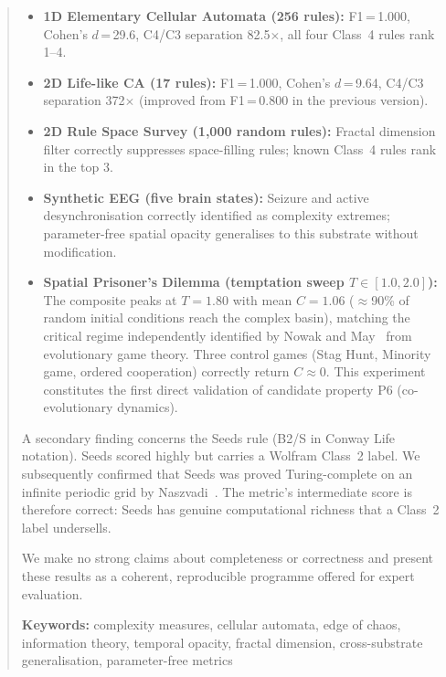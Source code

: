 \documentclass[12pt,a4paper]{article}
\begin{document}
\begin{abstract}
\begin{itemize}[noitemsep]
  \item \textbf{1D Elementary Cellular Automata (256 rules):}
    F1\,=\,1.000, Cohen's $d$\,=\,29.6, C4/C3 separation 82.5$\times$,
    all four Class~4 rules rank 1--4.
  \item \textbf{2D Life-like CA (17 rules):}
    F1\,=\,1.000, Cohen's $d$\,=\,9.64, C4/C3 separation 372$\times$
    (improved from F1\,=\,0.800 in the previous version).
  \item \textbf{2D Rule Space Survey (1,000 random rules):}
    Fractal dimension filter correctly suppresses space-filling rules;
    known Class~4 rules rank in the top 3.
  \item \textbf{Synthetic EEG (five brain states):}
    Seizure and active desynchronisation correctly identified as
    complexity extremes; parameter-free spatial opacity generalises
    to this substrate without modification.
  \item \textbf{Spatial Prisoner's Dilemma (temptation sweep $T\in[1.0,2.0]$):}
    The composite peaks at $T\!=\!1.80$ with mean $C\!=\!1.06$
    ($\approx$90\% of random initial conditions reach the complex basin),
    matching the critical regime independently identified by
    Nowak and May~\cite{nowak1992} from evolutionary game theory.
    Three control games (Stag Hunt, Minority game, ordered cooperation)
    correctly return $C\!\approx\!0$.
    This experiment constitutes the first direct validation of
    candidate property P6 (co-evolutionary dynamics).
\end{itemize}

A secondary finding concerns the Seeds rule (B2/S in Conway Life
notation).
Seeds scored highly but carries a Wolfram Class~2 label.
We subsequently confirmed that Seeds was proved Turing-complete on an
infinite periodic grid by Naszvadi~\cite{naszvadi2020}.
The metric's intermediate score is therefore correct: Seeds has
genuine computational richness that a Class~2 label undersells.

We make no strong claims about completeness or correctness and
present these results as a coherent, reproducible programme offered
for expert evaluation.

\bigskip
\noindent\textbf{Keywords:} complexity measures, cellular automata,
edge of chaos, information theory, temporal opacity, fractal
dimension, cross-substrate generalisation, parameter-free metrics
\end{abstract}
\end{document}

